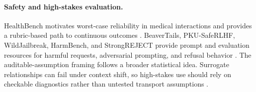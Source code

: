 \paragraph{Safety and high-stakes evaluation.}
HealthBench motivates worst-case reliability in medical interactions
and provides a rubric-based path to continuous outcomes
\citep{OpenAI2025HealthBench}. BeaverTails, PKU-SafeRLHF, WildJailbreak,
HarmBench, and StrongREJECT provide prompt and evaluation resources for
harmful requests, adversarial prompting, and refusal behavior
\citep{Ji2023BeaverTails,Ji2024PKUSafeRLHF,Jiang2024WildTeaming,
Mazeika2024HarmBench,Souly2024StrongREJECT}. The auditable-assumption
framing follows a broader statistical idea. Surrogate relationships
can fail under context shift, so high-stakes use should rely on
checkable diagnostics rather than untested transport assumptions
\citep{FlemingDeMets1996,Lipsitch2010,TchetgenTchetgen2024}.
